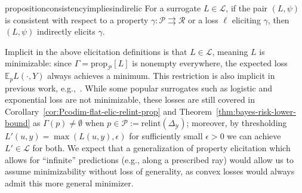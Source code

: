 \documentclass[11pt]{article} %
\newcommand{\Comments}{1}
\newcommand{\mytodo}[2]{\ifnum\Comments=1%
	\todo[linecolor=#1!80!black,backgroundcolor=#1,bordercolor=#1!80!black]{#2}\fi}
\newcommand{\jessiet}[1]{\mytodo{purple!20!white}{JF: #1}}
\newcommand{\btw}[1]{}%
\newcommand{\simplex}{\Delta_\Y}
\newcommand{\relint}[1]{\mathrm{relint}(#1)}
\newcommand{\prop}[2][\mathcal{P}]{\mathrm{prop}_{#1}[#2]}
\newcommand{\E}{\mathbb{E}}
\renewcommand{\L}{\mathcal{L}}
\newcommand{\R}{\mathcal{R}}
\renewcommand{\P}{\mathcal{P}}
\newcommand{\Y}{\mathcal{Y}}
\newcommand{\exploss}[3]{\E_{#3} #1(#2,Y)}
\newcommand{\toto}{\rightrightarrows}
\begin{document}
\begin{restatable}{proposition}{consistencyimpliesindirelic}\label{thm:consistent-implies-indir-elic}
	For a surrogate $L \in \L$, if the pair $(L, \psi)$ is consistent with respect to a property $\gamma: \P \toto \R$ or a loss $\ell$ eliciting $\gamma$, then $(L, \psi)$ indirectly elicits $\gamma$.
\end{restatable}


Implicit in the above elicitation definitions is that $L\in\L$, meaning $L$ is minimizable: since $\Gamma = \prop[\P]{L}$ is nonempty everywhere, the expected loss $\exploss{L}{\cdot}{p}$ always achieves a minimum.
This restriction is also implicit in previous work, e.g.,~\citep{agarwal2015consistent}.
While some popular surrogates such as logistic and exponential loss are not minimizable, these losses are still covered in Corollary~\ref{cor:Pcodim-flat-elic-relint-prop} and Theorem~\ref{thm:bayes-risk-lower-bound} as $\Gamma(p) \neq \emptyset$ when $p\in\P := \relint\simplex$; moreover, by thresholding $L'(u,y) = \max(L(u,y),\epsilon)$ for sufficiently small $\epsilon>0$ we can achieve $L'\in\L$ for both.
We expect that a generalization of property elicitation which allows for ``infinite'' predictions (e.g., along a prescribed ray) would allow us to assume minimizability without loss of generality, as convex losses would always admit this more general minimizer.
\btw{Some refs / related work commented out here.  I think not as relevant as elicitation complexity.}

\end{document}
